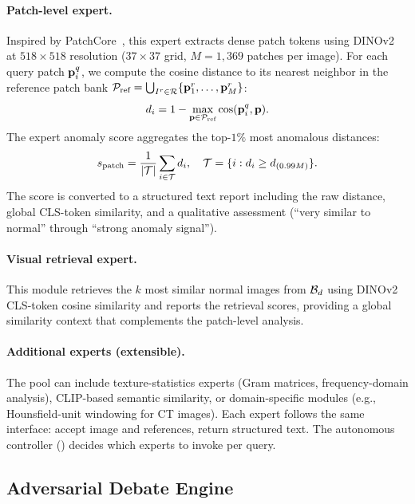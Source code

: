\paragraph{Patch-level expert.}
Inspired by PatchCore~\citep{roth2022patchcore}, this expert extracts dense patch tokens using DINOv2~\citep{oquab2024dinov2} at $518 \times 518$ resolution ($37 \times 37$ grid, $M = 1{,}369$ patches per image).
For each query patch $\mathbf{p}^q_i$, we compute the cosine distance to its nearest neighbor in the reference patch bank $\mathcal{P}_{\text{ref}} = \bigcup_{I^r \in \mathcal{R}} \{\mathbf{p}^r_1, \ldots, \mathbf{p}^r_M\}$:
\begin{equation}
    d_i = 1 - \max_{\mathbf{p} \in \mathcal{P}_{\text{ref}}} \cos(\mathbf{p}^q_i, \mathbf{p}).
    \label{eq:patch_distance}
\end{equation}
The expert anomaly score aggregates the top-$1\%$ most anomalous distances:
\begin{equation}
    s_{\text{patch}} = \frac{1}{|\mathcal{T}|} \sum_{i \in \mathcal{T}} d_i, \quad \mathcal{T} = \{i : d_i \geq d_{(0.99M)}\}.
    \label{eq:expert_score}
\end{equation}
The score is converted to a structured text report including the raw distance, global CLS-token similarity, and a qualitative assessment (``very similar to normal'' through ``strong anomaly signal'').

\paragraph{Visual retrieval expert.}
This module retrieves the $k$ most similar normal images from $\mathcal{B}_d$ using DINOv2 CLS-token cosine similarity and reports the retrieval scores, providing a global similarity context that complements the patch-level analysis.

\paragraph{Additional experts (extensible).}
The pool can include texture-statistics experts (Gram matrices, frequency-domain analysis), CLIP-based semantic similarity, or domain-specific modules (e.g., Hounsfield-unit windowing for CT images).
Each expert follows the same interface: accept image and references, return structured text.
The autonomous controller () decides which experts to invoke per query.

\subsection{Adversarial Debate Engine}
\label{sec:debate}

